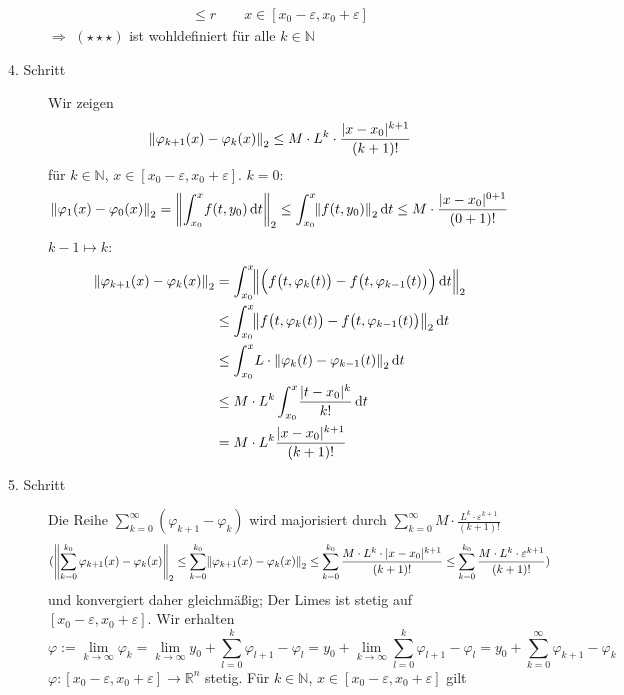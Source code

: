 \begin{description}
\begin{align*}
		\le r \qquad x \in [x_0 -\varepsilon, x_0 +\varepsilon]
	\end{align*}
	$\Rightarrow $ $(\star\star\star)$ ist wohldefiniert für alle $k \in \mathds{N}$
	\item[4. Schritt] Wir zeigen 
	\begin{align*}
		\norm[2]{\varphi_{k+1}(x)- \varphi_k(x)} \le M \cdot L^k \cdot \frac{\abs{x-x_0}^{k+1} }{(k+1)!} 
	\end{align*}
	für $k \in \mathds{N}$, $x \in [x_0 -\varepsilon, x_0 +\varepsilon]$. $k=0$: 
	\[
		\norm[2]{\varphi_1(x) - \varphi_0(x)} = \norm[2]{\int_{x_0} ^{x} \! f(t,y_0)  \, \mathrm{d}t}  \le \int_{x_0} ^{x} \! \norm[2]{f(t,y_0)}  \, \mathrm{d}t 
		\le M \cdot \frac{\abs{x-x_0}^{0+1} }{(0+1)!}
	\]
	$k-1 \mapsto k$:
	\begin{align*}
		\norm[2]{\varphi_{k+1}(x) - \varphi_k(x)} &= \int_{x_0} ^{x} \! \norm[2]{\Big(f\big(t, \varphi_k(t)\big) - f\big(t, \varphi_{k-1}(t)\big)\Big)  \, \mathrm{d}t} \\
		&\le \int_{x_0} ^{x} \! \norm[2]{f\big(t,\varphi_k(t)\big) -f\big(t, \varphi_{k-1}(t)\big) }  \, \mathrm{d}t \\
		&\le  \int_{x_0} ^{x} \! L \cdot \norm[2]{\varphi_k(t) - \varphi_{k-1}(t)}  \, \mathrm{d}t \\
		&\le M \cdot L^k \int_{x_0} ^{x} \! \frac{\abs{t-x_0}^k}{k!}  \, \mathrm{d}t \\
		&= M \cdot L^k \frac{\abs{x-x_0}^{k+1} }{(k+1)!} 
	\end{align*}
	\item[5. Schritt] Die Reihe $\sum_{k=0}^{\infty} (\varphi_{k+1} - \varphi_{k})$ wird majorisiert durch 
	$\sum_{k=0}^{\infty} M \cdot \frac{L^k \cdot \varepsilon^{k+1}}{(k+1)!}  $
	\begin{align*}
		\enbrace{\norm[2]{\sum_{k=0}^{k_0} \varphi_{k+1}(x) - \varphi_{k}(x)} \le \sum_{k=0}^{k_0}  \norm[2]{\varphi_{k+1}(x) - \varphi_{k}(x)}  \le  \sum_{k=0}^{k_0}
		\frac{M \cdot L^k \cdot \abs{x-x_0}^{k+1} }{(k+1)!}  \le \sum_{k=0}^{k_0} \frac{M \cdot L^k \cdot \varepsilon^{k+1}}{(k+1)!} }
	\end{align*}
	und konvergiert daher gleichmäßig; Der Limes ist stetig auf $[x_0 -\varepsilon, x_0 +\varepsilon]$. Wir erhalten 
	\[
		\varphi := \lim_{ k \to \infty} \varphi_k =  \lim_{ k \to \infty} y_0 + \sum_{l=0}^{k} \varphi_{l+1}- \varphi_l = y_0 + \lim_{ k \to \infty} \sum_{l=0}^{k}
		\varphi_{l+1} - \varphi_l = y_0 + \sum_{k=0}^{\infty} \varphi_{k+1} - \varphi_{k}
	\]
	$\varphi : [x_0 -\varepsilon, x_0 +\varepsilon] \to \mathds{R}^n$ stetig. Für $k \in \mathds{N}$, $x \in [x_0 -\varepsilon, x_0 +\varepsilon]$ gilt 

\end{description}
